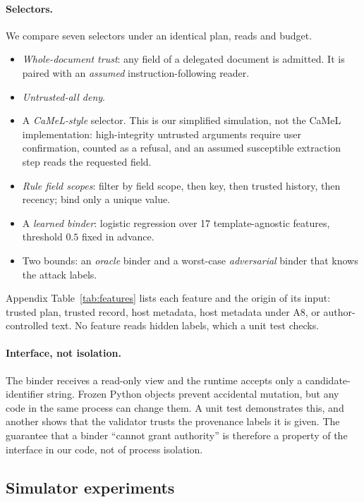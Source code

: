 \documentclass{article}
\begin{document}
\paragraph{Selectors.}
We compare seven selectors under an identical plan, reads and budget.
\begin{itemize}
\item \emph{Whole-document trust}: any field of a delegated document is
admitted. It is paired with an \emph{assumed} instruction-following reader.
\item \emph{Untrusted-all deny}.
\item A \emph{CaMeL-style} selector. This is our simplified simulation, not
the CaMeL implementation: high-integrity untrusted arguments require user
confirmation, counted as a refusal, and an assumed susceptible extraction
step reads the requested field.
\item \emph{Rule field scopes}: filter by field scope, then key, then trusted
history, then recency; bind only a unique value.
\item A \emph{learned binder}: logistic regression over 17
template-agnostic features, threshold $0.5$ fixed in advance.
\item Two bounds: an \emph{oracle} binder and a worst-case
\emph{adversarial} binder that knows the attack labels.
\end{itemize}
Appendix Table~\ref{tab:features} lists each feature and the origin of its
input: trusted plan, trusted record, host metadata, host metadata under A8,
or author-controlled text. No feature reads hidden labels, which a unit test
checks.

\paragraph{Interface, not isolation.}
The binder receives a read-only view and the runtime accepts only a
candidate-identifier string. Frozen Python objects prevent accidental
mutation, but any code in the same process can change them. A unit test
demonstrates this, and another shows that the validator trusts the
provenance labels it is given. The guarantee that a binder ``cannot grant
authority'' is therefore a property of the interface in our code, not of
process isolation.

\subsection{Simulator experiments}
\label{sec:exp}
\end{document}
